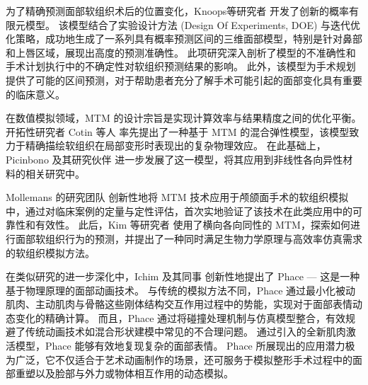为了精确预测面部软组织术后的位置变化，Knoops等研究者 \cite{knoopsNovelSoftTissue2018} 开发了创新的概率有限元模型。
该模型结合了实验设计方法 (Design Of Experiments, DOE) 与迭代优化策略，成功地生成了一系列具有概率预测区间的三维面部模型，特别是针对鼻部和上唇区域，展现出高度的预测准确性。
此项研究深入剖析了模型的不准确性和手术计划执行中的不确定性对软组织预测结果的影响。
此外，该模型为手术规划提供了可能的区间预测，对于帮助患者充分了解手术可能引起的面部变化具有重要的临床意义。

在数值模拟领域，MTM 的设计宗旨是实现计算效率与结果精度之间的优化平衡。
开拓性研究者 Cotin 等人 \cite{cotinHybridElasticModel2000} 率先提出了一种基于 MTM 的混合弹性模型，该模型致力于精确描绘软组织在局部变形时表现出的复杂物理效应。
在此基础上，Picinbono 及其研究伙伴 \cite{picinbonoNonlinearAnisotropicElasticity2003} 进一步发展了这一模型，将其应用到非线性各向异性材料的相关研究中。

Mollemans 的研究团队 \cite{mollemansPredictingSoftTissue2007} 创新性地将 MTM 技术应用于颅颌面手术的软组织模拟中，通过对临床案例的定量与定性评估，首次实地验证了该技术在此类应用中的可靠性和有效性。
此后，Kim 等研究者 \cite{kimNewSofttissueSimulation2010} 使用了横向各向同性的 MTM，探索如何进行面部软组织行为的预测，并提出了一种同时满足生物力学原理与高效率仿真需求的软组织模拟方法。

在类似研究的进一步深化中，Ichim 及其同事 \cite{ichimPhacePhysicsbasedFace2017} 创新性地提出了 Phace --- 这是一种基于物理原理的面部动画技术。
与传统的模拟方法不同，Phace 通过最小化被动肌肉、主动肌肉与骨骼这些刚体结构交互作用过程中的势能，实现对于面部表情动态变化的精确计算。
而且，Phace 通过将碰撞处理机制与仿真模型整合，有效规避了传统动画技术如混合形状建模中常见的不合理问题。
通过引入的全新肌肉激活模型，Phace 能够有效地复现复杂的面部表情。
Phace 所展现出的应用潜力极为广泛，它不仅适合于艺术动画制作的场景，还可服务于模拟整形手术过程中的面部重塑以及脸部与外力或物体相互作用的动态模拟。
